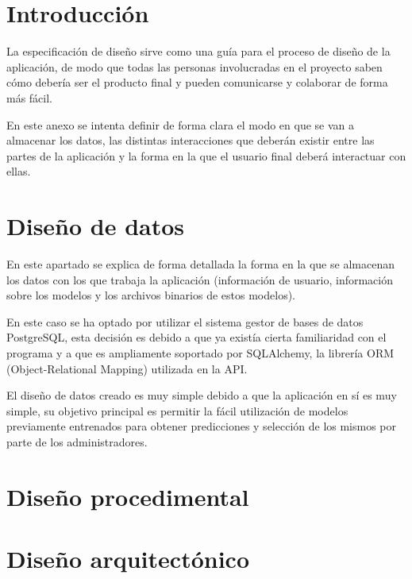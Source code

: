 \label{cha:Especificación de diseño}

\section{Introducción}

La especificación de diseño sirve como una guía para el proceso de diseño de la
aplicación, de modo que todas las personas involucradas en el proyecto saben
cómo debería ser el producto final y pueden comunicarse y colaborar de forma más
fácil.

En este anexo se intenta definir de forma clara el modo en que se van a
almacenar los datos, las distintas interacciones que deberán existir entre las
partes de la aplicación y la forma en la que el usuario final deberá interactuar
con ellas.

\section{Diseño de datos}

En este apartado se explica de forma detallada la forma en la que se almacenan
los datos con los que trabaja la aplicación (información de usuario, información
sobre los modelos y los archivos binarios de estos modelos).

En este caso se ha optado por utilizar el sistema gestor de bases de datos
PostgreSQL, esta decisión es debido a que ya existía cierta familiaridad con el
programa y a que es ampliamente soportado por SQLAlchemy, la librería ORM
(Object-Relational Mapping) utilizada en la API.

El diseño de datos creado es muy simple debido a que la aplicación en sí es muy
simple, su objetivo principal es permitir la fácil utilización de modelos
previamente entrenados para obtener predicciones y selección de los mismos por
parte de los administradores.

\section{Diseño procedimental}

\section{Diseño arquitectónico}


